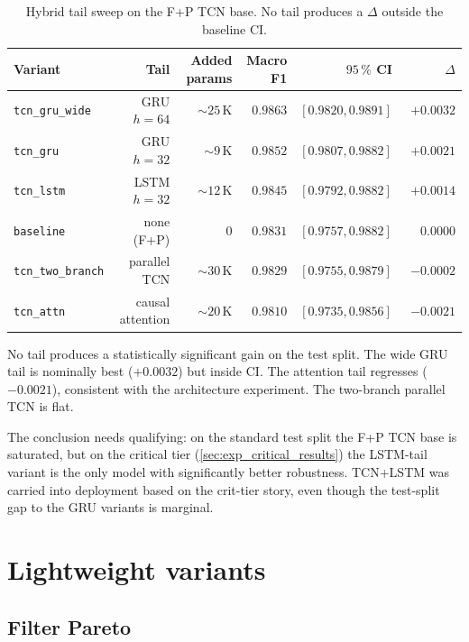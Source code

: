 \begin{table}[h]
\centering
\begin{tabular}{lrrrrr}
\toprule
\textbf{Variant} & \textbf{Tail} & \textbf{Added params} & \textbf{Macro F1} & \textbf{$95\,\%$ CI} & \textbf{$\Delta$} \\
\midrule
\texttt{tcn\_gru\_wide}   & GRU $h=64$       & $\sim 25$\,K & $\mathbf{0.9863}$ & $[0.9820, 0.9891]$ & $+0.0032$ \\
\texttt{tcn\_gru}         & GRU $h=32$       & $\sim 9$\,K  & $0.9852$          & $[0.9807, 0.9882]$ & $+0.0021$ \\
\texttt{tcn\_lstm}        & LSTM $h=32$      & $\sim 12$\,K & $0.9845$          & $[0.9792, 0.9882]$ & $+0.0014$ \\
\texttt{baseline}         & none (F+P)       & $0$ & $0.9831$          & $[0.9757, 0.9882]$ & $\phantom{+}0.0000$ \\
\texttt{tcn\_two\_branch} & parallel TCN     & $\sim 30$\,K & $0.9829$          & $[0.9755, 0.9879]$ & $-0.0002$ \\
\texttt{tcn\_attn}        & causal attention & $\sim 20$\,K & $0.9810$          & $[0.9735, 0.9856]$ & $-0.0021$ \\
\bottomrule
\end{tabular}
\caption{Hybrid tail sweep on the F+P TCN base. No tail produces a $\Delta$ outside the baseline CI.}
\label{tab:hybrid_results}
\end{table}

No tail produces a statistically significant gain on the test split.
The wide GRU tail is nominally best ($+0.0032$) but inside CI.
The attention tail regresses ($-0.0021$), consistent with the architecture experiment.
The two-branch parallel TCN is flat.

The conclusion needs qualifying: on the standard test split the F+P TCN base is saturated, but on the critical tier (\cref{sec:exp_critical_results}) the LSTM-tail variant is the only model with significantly better robustness.
TCN+LSTM was carried into deployment based on the crit-tier story, even though the test-split gap to the GRU variants is marginal.

\section{Lightweight variants}
\label{sec:exp_lightweight}

\subsection{Filter Pareto}
\label{subsec:exp_small_tcn_pareto}
\label{sec:exp_small_tcn_pareto}

